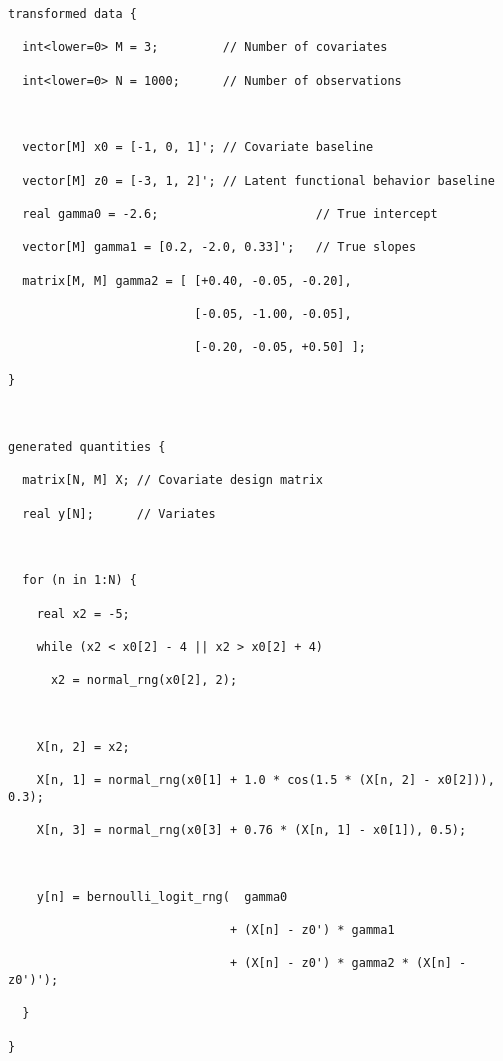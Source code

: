 \documentclass[
  letterpaper,
  DIV=11,
  numbers=noendperiod]{scrartcl}
\begin{document}
\begin{verbatim}
transformed data {

  int<lower=0> M = 3;         // Number of covariates

  int<lower=0> N = 1000;      // Number of observations

  

  vector[M] x0 = [-1, 0, 1]'; // Covariate baseline

  vector[M] z0 = [-3, 1, 2]'; // Latent functional behavior baseline

  real gamma0 = -2.6;                      // True intercept

  vector[M] gamma1 = [0.2, -2.0, 0.33]';   // True slopes

  matrix[M, M] gamma2 = [ [+0.40, -0.05, -0.20],

                          [-0.05, -1.00, -0.05],

                          [-0.20, -0.05, +0.50] ];

}



generated quantities {

  matrix[N, M] X; // Covariate design matrix

  real y[N];      // Variates



  for (n in 1:N) {

    real x2 = -5;

    while (x2 < x0[2] - 4 || x2 > x0[2] + 4)

      x2 = normal_rng(x0[2], 2);

    

    X[n, 2] = x2;

    X[n, 1] = normal_rng(x0[1] + 1.0 * cos(1.5 * (X[n, 2] - x0[2])), 0.3);

    X[n, 3] = normal_rng(x0[3] + 0.76 * (X[n, 1] - x0[1]), 0.5);



    y[n] = bernoulli_logit_rng(  gamma0 

                               + (X[n] - z0') * gamma1

                               + (X[n] - z0') * gamma2 * (X[n] - z0')');

  }

}
\end{verbatim}
\end{document}
